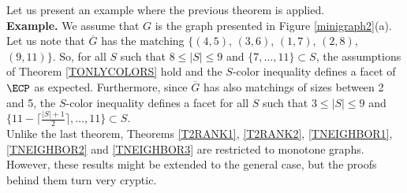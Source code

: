 Let us present an example where the previous theorem is applied.\\

\noindent \textbf{Example.} We assume that $G$ is the graph presented in Figure \ref{minigraph2}(a). Let us note that $\overline{G}$ has the matching $\{(4,5)$, $(3,6)$, $(1,7)$, $(2,8)$, $(9,11)\}$. So, for all $S$ such that
$8 \leq |S| \leq 9$ and $\{7,\ldots,11\} \subset S$, the assumptions of Theorem \ref{TONLYCOLORS}
hold and the $S$-color inequality defines a facet of $\ECP$ as expected. Furthermore,
since $\overline{G}$ has also matchings of sizes between 2 and 5, the $S$-color
inequality defines a facet for all $S$ such that $3 \leq |S| \leq 9$ and
$\{ 11 - \lceil \frac{|S|+1}{2} \rceil, \ldots, 11\} \subset S$.\\

Unlike the last theorem, Theorems \ref{T2RANK1}, \ref{T2RANK2}, \ref{TNEIGHBOR1}, \ref{TNEIGHBOR2}
and \ref{TNEIGHBOR3} are restricted to monotone graphs. However, these results might be extended to
the general case, but the proofs behind them turn very cryptic.

%